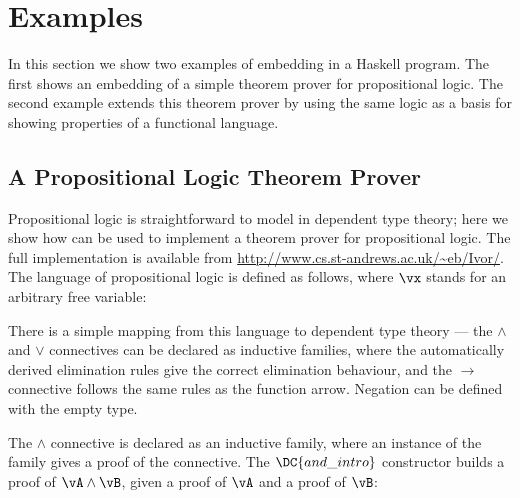 \section{Examples}

In this section we show two examples of embedding \Ivor{} in a Haskell
program. The first shows an embedding of a simple theorem prover for
propositional logic. The second example extends this theorem prover by
using the same logic as a basis for showing properties of a functional
language.

\subsection{A Propositional Logic Theorem Prover}

\label{example1}

Propositional logic is straightforward to model in dependent type
theory; here we show how \Ivor{} can be used to implement a theorem
prover for propositional logic. The full implementation is available
from \url{http://www.cs.st-andrews.ac.uk/~eb/Ivor/}.  The language of
propositional logic is defined as follows, where $\vx$ stands for an
arbitrary free variable:


\newcommand{\Tand}{\TC{And}}
\newcommand{\andintro}{\DC{and\_intro}}
\newcommand{\Tor}{\TC{Or}}
\newcommand{\orintrol}{\DC{inl}}
\newcommand{\orintror}{\DC{inr}}

There is a simple mapping from this language to dependent type theory
--- the $\land$ and $\lor$ connectives can be declared as inductive
families, where the automatically derived elimination rules give the
correct elimination behaviour, and the $\to$ connective follows the
same rules as the function arrow. Negation can be defined with the
empty type.

The $\land$ connective is declared as an inductive family, where an
instance of the family gives a proof of the connective. The $\andintro$
constructor builds a proof of $\vA\land\vB$, given a proof of $\vA$ and
a proof of $\vB$:

\DM{
\AR{
\Data\:\Tand\:(\vA,\vB\Hab\Type)\Hab\Type\hg\Where\\
\hg\hg
\andintro\Hab\fbind{\va}{\vA}{\fbind{\vb}{\vB}{\Tand\:\vA\:\vB}}
}
}

